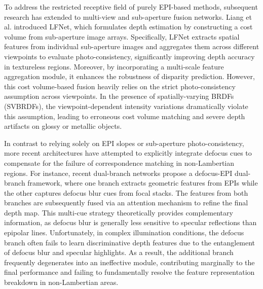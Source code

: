 \documentclass[lettersize,journal]{IEEEtran}
\begin{document}
To address the restricted receptive field of purely EPI-based methods, subsequent research has extended to multi-view and sub-aperture fusion networks. Liang et al. \cite{pdfpdf} introduced LFNet, which formulates depth estimation by constructing a cost volume from sub-aperture image arrays. Specifically, LFNet extracts spatial features from individual sub-aperture images and aggregates them across different viewpoints to evaluate photo-consistency, significantly improving depth accuracy in textureless regions. Moreover, by incorporating a multi-scale feature aggregation module, it enhances the robustness of disparity prediction. However, this cost volume-based fusion heavily relies on the strict photo-consistency assumption across viewpoints. In the presence of spatially-varying BRDFs (SVBRDFs), the viewpoint-dependent intensity variations dramatically violate this assumption, leading to erroneous cost volume matching and severe depth artifacts on glossy or metallic objects.

In contrast to relying solely on EPI slopes or sub-aperture photo-consistency, more recent architectures have attempted to explicitly integrate defocus cues to compensate for the failure of correspondence matching in non-Lambertian regions. For instance, recent dual-branch networks \cite{dualdual} propose a defocus-EPI dual-branch framework, where one branch extracts geometric features from EPIs while the other captures defocus blur cues from focal stacks. The features from both branches are subsequently fused via an attention mechanism to refine the final depth map. This multi-cue strategy theoretically provides complementary information, as defocus blur is generally less sensitive to specular reflections than epipolar lines. Unfortunately, in complex illumination conditions, the defocus branch often fails to learn discriminative depth features due to the entanglement of defocus blur and specular highlights. As a result, the additional branch frequently degenerates into an ineffective module, contributing marginally to the final performance and failing to fundamentally resolve the feature representation breakdown in non-Lambertian areas.
\end{document}
